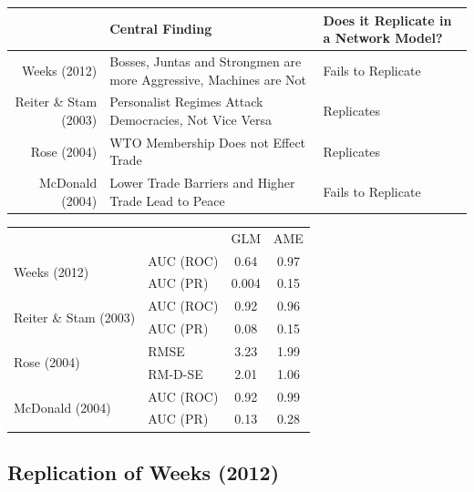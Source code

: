 \documentclass[12pt]{amsart}
\begin{document}
\begin{table}[ht]
\centering
	\begin{tabular}{r p{4cm} l}
	\hline
		& Central Finding & Does it Replicate in a Network Model? \\ 
		\hline
		Weeks (2012) & Bosses, Juntas and Strongmen are more Aggressive, Machines are Not & Fails to Replicate \\
		Reiter \& Stam (2003) & Personalist Regimes Attack Democracies, Not Vice Versa & Replicates \\ 
		Rose (2004) & WTO Membership Does not Effect Trade & Replicates \\ 
		McDonald (2004) & Lower Trade Barriers and Higher Trade Lead to Peace & Fails to Replicate \\ 
	\hline
	\end{tabular}
\end{table}

\begin{table}[ht]
\centering
\begin{tabular}{ll cc}
~ & ~ & GLM & AME \\
\multirow{2}{*}{Weeks (2012)} & AUC (ROC) & 0.64 & 0.97 \\
~ & AUC (PR) & 0.004 & 0.15 \\
\multirow{2}{*}{Reiter \& Stam (2003)} & AUC (ROC) & 0.92 & 0.96 \\
~ & AUC (PR) & 0.08 & 0.15 \\
\multirow{2}{*}{Rose (2004)} & RMSE & 3.23 & 1.99 \\
~ & RM-D-SE & 2.01 & 1.06 \\
\multirow{2}{*}{McDonald (2004)} & AUC (ROC) & 0.92 & 0.99 \\
~ & AUC (PR) & 0.13 & 0.28 \\
\end{tabular}
\end{table}

\subsection{Replication of Weeks (2012)}
\end{document}
